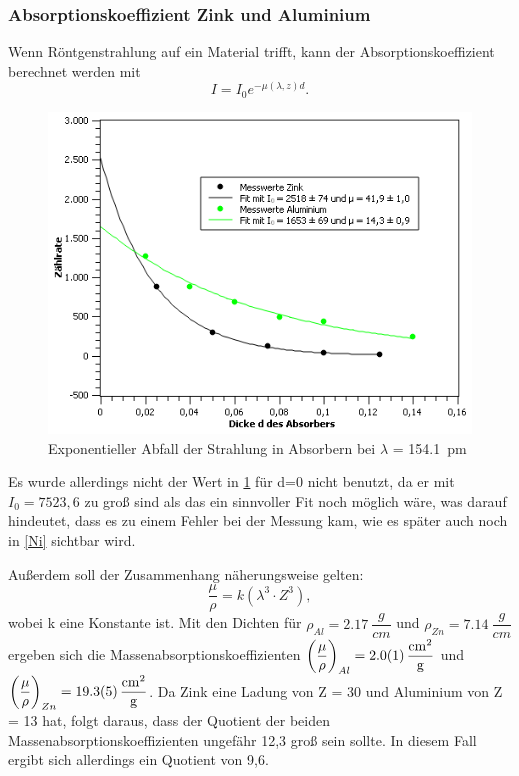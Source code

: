 \documentclass[
	a4paper,
	12pt,
	pagesize,
	ngerman
]{scrartcl}
\begin{document}
\subsubsection{Absorptionskoeffizient Zink und Aluminium}

 Wenn Röntgenstrahlung auf ein Material trifft, kann der Absorptionskoeffizient berechnet werden mit
\begin{equation}
I = I_{0} e^{- \mu(\lambda,z) d}.
\label{Absorp}
\end{equation}

\begin{figure}[h!]
	\centering
	\includegraphics[scale = 1]{expo.png} 
	\caption{Exponentieller Abfall der Strahlung in Absorbern bei $\lambda$ = \SI{154,1}{pm}}
	\label{expo}
\end{figure}

Es wurde allerdings nicht der Wert in \cref{expo} für d=0 nicht benutzt, da er mit $I_{0} = 7523,6$ zu groß sind als das ein sinnvoller Fit noch möglich wäre, was darauf hindeutet, dass es zu einem Fehler bei der Messung kam, wie es später auch noch in \cref{Ni} sichtbar wird.

Außerdem soll der Zusammenhang näherungsweise gelten:
\begin{equation}
\dfrac{\mu}{\rho} = k(\lambda^{3} \cdot Z^{3}),
\label{Z}
\end{equation}
wobei k eine Konstante ist. Mit den Dichten für $\rho_{Al} = \SI{2,17}{\dfrac{g}{cm}}$ und $\rho_{Zn} = \SI{7,14}{\dfrac{g}{cm}}$ ergeben sich die Massenabsorptionskoeffizienten $\left(\dfrac{\mu}{\rho}\right)_{Al} = \SI{2,0 \pm 0,1}{\dfrac{cm^{2}}{g}}$ und $\left(\dfrac{\mu}{\rho}\right)_{Zn} = \SI{19,3 \pm 0,5}{\dfrac{cm^{2}}{g}}$. Da Zink eine Ladung von Z = 30 und Aluminium von Z = 13 hat, folgt daraus, dass der Quotient der beiden Massenabsorptionskoeffizienten ungefähr 12,3 groß sein sollte. In diesem Fall ergibt sich allerdings ein Quotient von 9,6.
\end{document}
